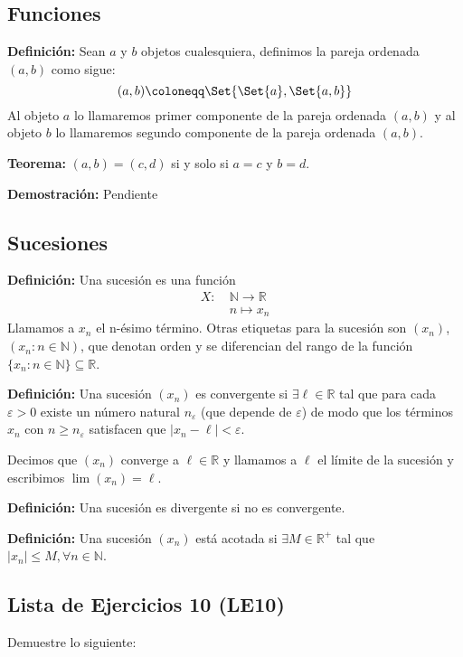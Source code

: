 \documentclass[11pt]{article}
\newcommand{\N}{\mathbb{N}}
\newcommand{\R}{\mathbb{R}}
\let\set\Set
\begin{document}
\subsection*{Funciones}

\textbf{Definición:} Sean $a$ y $b$ objetos cualesquiera, definimos la pareja ordenada $(a,b)$ como sigue: \[
    (a,b)\coloneqq \set{\set{a}, \set{a,b}}\]
Al objeto $a$ lo llamaremos primer componente de la pareja ordenada $(a,b)$ y al objeto $b$ lo llamaremos segundo componente de la pareja ordenada $(a,b)$.

\textbf{Teorema:} $(a,b)=(c,d)$ si y solo si $a=c$ y $b=d$.

\textbf{Demostración:} Pendiente

\subsection*{Sucesiones}

\textbf{Definición:} Una sucesión es una función %
\begin{align*}
    X: \ & \N \to \R \\
    \ &  n \mapsto x_n 
\end{align*}
%
Llamamos a $x_n$ el n-ésimo término. Otras etiquetas para la sucesión son $(x_n)$, $(x_n:n\in \N)$, que denotan orden y se diferencian del rango de la función $\{x_n:n\in \N\}\subseteq \R$.

\textbf{Definición:} Una sucesión $(x_n)$ es convergente si $\exists \ell \in \R$ tal que para cada $\varepsilon>0$ existe un número natural $n_\varepsilon$ (que depende de $\varepsilon$) de modo que los términos $x_n$ con $n\geq n_\varepsilon$ satisfacen que $|x_n-\ell|<\varepsilon$.

Decimos que $(x_n)$ converge a $\ell \in \R$ y llamamos a $\ell$ el límite de la sucesión y escribimos $\lim (x_n) = \ell$.

\textbf{Definición:} Una sucesión es divergente si no es convergente.

\textbf{Definición:} Una sucesión $(x_n)$ está acotada si $\exists M\in \R^+$ tal que $|x_n|\leq M, \forall n\in \N$.

\subsection*{Lista de Ejercicios 10 (LE10)}

Demuestre lo siguiente:
\end{document}
